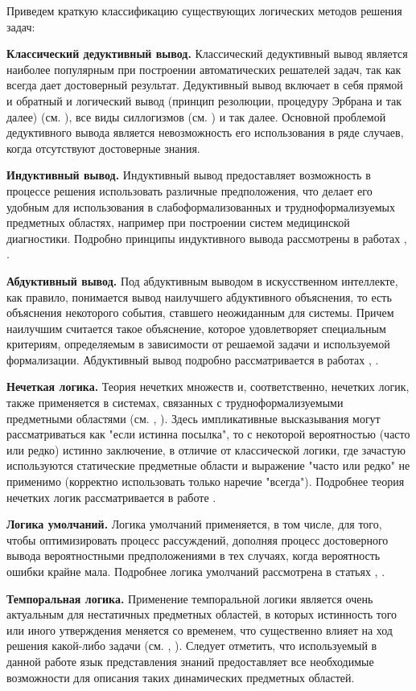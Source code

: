 Приведем краткую классификацию существующих логических методов решения задач:
\begin{textitemize}
	\item{\textbf{Классический дедуктивный вывод.} Классический дедуктивный вывод является наиболее популярным при построении автоматических решателей задач, так как всегда дает достоверный результат. Дедуктивный вывод включает в себя прямой и обратный и логический вывод (принцип резолюции, процедуру Эрбрана и так далее) (см. ), все виды силлогизмов (см. ) и так далее. Основной проблемой дедуктивного вывода является невозможность его использования в ряде случаев, когда отсутствуют достоверные знания.}
	\item{\textbf{Индуктивный вывод.} Индуктивный вывод предоставляет возможность в процессе решения использовать различные предположения, что делает его удобным для использования в слабоформализованных и трудноформализуемых предметных областях, например при построении систем медицинской диагностики. Подробно принципы индуктивного вывода рассмотрены в работах , .}
	\item{\textbf{Абдуктивный вывод.} Под абдуктивным выводом в искусственном интеллекте, как правило, понимается вывод наилучшего абдуктивного объяснения, то есть объяснения некоторого события, ставшего неожиданным для системы. Причем наилучшим считается такое объяснение, которое удовлетворяет специальным критериям, определяемым в зависимости от решаемой задачи и используемой	формализации. Абдуктивный вывод подробно рассматривается в работах , .}
	\item{\textbf{Нечеткая логика.} Теория нечетких множеств и, соответственно, нечетких логик, также применяется в системах, связанных с трудноформализуемыми предметными областями (см. , ). Здесь импликативные высказывания могут рассматриваться как "если истинна посылка"{}, то с некоторой вероятностью (часто или редко) истинно заключение, в отличие от классической логики, где зачастую используются статические предметные области и выражение "часто или редко"{} не применимо (корректно использовать только наречие "всегда"{}). Подробнее теория нечетких логик рассматривается в работе .}
	\item{\textbf{Логика умолчаний.} Логика умолчаний применяется, в том числе, для того, чтобы оптимизировать процесс рассуждений,	дополняя процесс достоверного вывода вероятностными  предположениями в тех случаях, когда вероятность ошибки крайне мала. Подробнее логика умолчаний рассмотрена в статьях , .}
	\item{\textbf{Темпоральная логика.} Применение темпоральной логики является очень актуальным для нестатичных предметных областей, в которых истинность того или иного утверждения меняется со временем, что существенно влияет на ход решения какой-либо задачи (см. , ). Следует отметить, что используемый в данной работе язык представления знаний предоставляет все необходимые возможности для описания таких динамических предметных областей.}
\end{textitemize}

